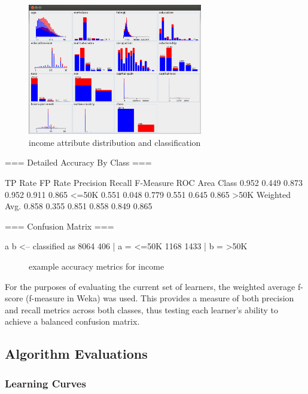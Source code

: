 \documentclass{sig-alternate}
\begin{document}
\begin{figure}[!htbp]
    \centering
    \includegraphics[width=3in]{data/adult/ad-data-viz.png}
    \caption{income attribute distribution and classification \label{ad-data-viz}}
\end{figure} 

\tiny
\begin{verbbox}
=== Detailed Accuracy By Class ===

               TP Rate   FP Rate   Precision   Recall  F-Measure   ROC Area  Class
                 0.952     0.449      0.873     0.952     0.911      0.865     <=50K
                 0.551     0.048      0.779     0.551     0.645      0.865     >50K
Weighted Avg.    0.858     0.355      0.851     0.858     0.849      0.865

=== Confusion Matrix ===

    a    b   <-- classified as
 8064  406 |    a =  <=50K
 1168 1433 |    b =  >50K
\end{verbbox}
\normalsize

\begin{figure}[!htbp]
    \centering
    \theverbbox
    \caption{example accuracy metrics for income \label{ad-metrics}}
\end{figure}


For the purposes of evaluating the current set of learners, the weighted average f-score (f-measure in Weka) was used. This provides a measure of both precision and recall metrics across both classes, thus testing each learner's ability to achieve a balanced confusion matrix.



\subsection{Algorithm Evaluations}

\subsubsection{Learning Curves}
\end{document}
